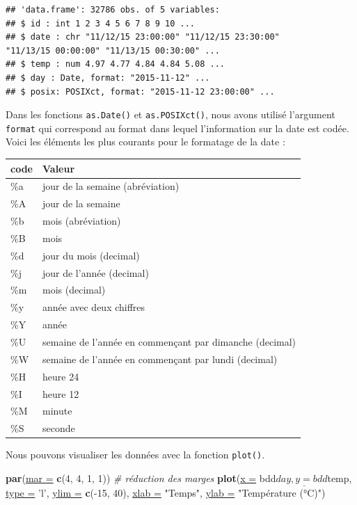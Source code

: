 \documentclass[twoside,symmetric]{book}
\newenvironment{Shaded}{}{}
\newcommand{\CommentTok}[1]{\textit{#1}}
\newcommand{\DataTypeTok}[1]{\underline{#1}}
\newcommand{\DecValTok}[1]{#1}
\newcommand{\KeywordTok}[1]{\textbf{#1}}
\newcommand{\NormalTok}[1]{#1}
\newcommand{\OperatorTok}[1]{#1}
\newcommand{\StringTok}[1]{#1}
\begin{document}
\begin{verbatim}
## 'data.frame': 32786 obs. of 5 variables:
## $ id : int 1 2 3 4 5 6 7 8 9 10 ...
## $ date : chr "11/12/15 23:00:00" "11/12/15 23:30:00"
"11/13/15 00:00:00" "11/13/15 00:30:00" ...
## $ temp : num 4.97 4.77 4.84 4.84 5.08 ...
## $ day : Date, format: "2015-11-12" ...
## $ posix: POSIXct, format: "2015-11-12 23:00:00" ...
\end{verbatim}

Dans les fonctions \texttt{as.Date()} et \texttt{as.POSIXct()}, nous avons utilisé l'argument \texttt{format} qui correspond au format dans lequel l'information sur la date est codée. Voici les éléments les plus courants pour le formatage de la date :

\begin{longtable}[]{@{}ll@{}}
\toprule
code & Valeur\tabularnewline
\midrule
\endhead
\%a & jour de la semaine (abréviation)\tabularnewline
\%A & jour de la semaine\tabularnewline
\%b & mois (abréviation)\tabularnewline
\%B & mois\tabularnewline
\%d & jour du mois (decimal)\tabularnewline
\%j & jour de l'année (decimal)\tabularnewline
\%m & mois (decimal)\tabularnewline
\%y & année avec deux chiffres\tabularnewline
\%Y & année\tabularnewline
\%U & semaine de l'année en commençant par dimanche (decimal)\tabularnewline
\%W & semaine de l'année en commençant par lundi (decimal)\tabularnewline
\%H & heure 24\tabularnewline
\%I & heure 12\tabularnewline
\%M & minute\tabularnewline
\%S & seconde\tabularnewline
\bottomrule
\end{longtable}

Nous pouvons visualiser les données avec la fonction \texttt{plot()}.

\begin{Shaded}
\begin{Highlighting}[]
\KeywordTok{par}\NormalTok{(}\DataTypeTok{mar =} \KeywordTok{c}\NormalTok{(}\DecValTok{4}\NormalTok{, }\DecValTok{4}\NormalTok{, }\DecValTok{1}\NormalTok{, }\DecValTok{1}\NormalTok{)) }\CommentTok{# réduction des marges}
\KeywordTok{plot}\NormalTok{(}\DataTypeTok{x =}\NormalTok{ bdd}\OperatorTok{$}\NormalTok{day, }\DataTypeTok{y =}\NormalTok{ bdd}\OperatorTok{$}\NormalTok{temp, }
    \DataTypeTok{type =} \StringTok{'l'}\NormalTok{, }\DataTypeTok{ylim =} \KeywordTok{c}\NormalTok{(}\OperatorTok{-}\DecValTok{15}\NormalTok{, }\DecValTok{40}\NormalTok{), }
    \DataTypeTok{xlab =} \StringTok{"Temps"}\NormalTok{, }\DataTypeTok{ylab =} \StringTok{"Température (°C)"}\NormalTok{)}
\end{Highlighting}
\end{Shaded}
\end{document}
